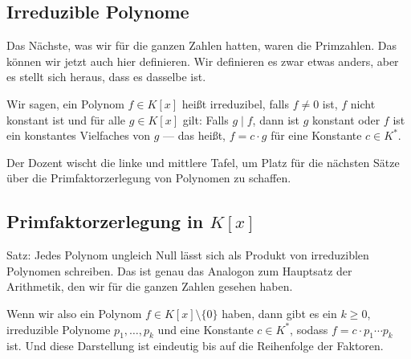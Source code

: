 \subsection{Irreduzible Polynome}

\begin{spoken-clean}[00:31:36 - 00:35:30]
Das Nächste, was wir für die ganzen Zahlen hatten, waren die Primzahlen. Das können wir jetzt auch hier definieren. Wir definieren es zwar etwas anders, aber es stellt sich heraus, dass es dasselbe ist.

Wir sagen, ein Polynom $f \in K[x]$ heißt irreduzibel, falls $f \neq 0$ ist, $f$ nicht konstant ist und für alle $g \in K[x]$ gilt: Falls $g \mid f$, dann ist $g$ konstant oder $f$ ist ein konstantes Vielfaches von $g$ --- das heißt, $f = c \cdot g$ für eine Konstante $c \in K^*$.
\end{spoken-clean}

\begin{math-stroke}
\end{math-stroke}

\begin{meta-note}[Tafelreinigung]
Der Dozent wischt die linke und mittlere Tafel, um Platz für die nächsten Sätze über die Primfaktorzerlegung von Polynomen zu schaffen.
\end{meta-note}

\subsection{Primfaktorzerlegung in \texorpdfstring{$K[x]$}{K[x]}}

\begin{spoken-clean}[00:35:30 - 00:38:02]
Satz: Jedes Polynom ungleich Null lässt sich als Produkt von irreduziblen Polynomen schreiben. Das ist genau das Analogon zum Hauptsatz der Arithmetik, den wir für die ganzen Zahlen gesehen haben.

Wenn wir also ein Polynom $f \in K[x] \setminus \{0\}$ haben, dann gibt es ein $k \ge 0$, irreduzible Polynome $p_1, \dots, p_k$ und eine Konstante $c \in K^*$, sodass $f = c \cdot p_1 \cdots p_k$ ist. Und diese Darstellung ist eindeutig bis auf die Reihenfolge der Faktoren.
\end{spoken-clean}

